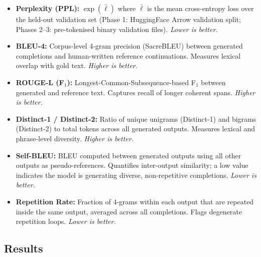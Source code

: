 \documentclass[12pt]{article}
\begin{document}
\begin{itemize}
    \item \textbf{Perplexity (PPL):} $\exp(\bar{\ell})$ where $\bar{\ell}$ is the mean cross-entropy loss over the held-out validation set (Phase 1: HuggingFace Arrow validation split; Phases 2--3: pre-tokenised binary validation files). \textit{Lower is better.}

    \item \textbf{BLEU-4:} Corpus-level 4-gram precision (SacreBLEU) between generated completions and human-written reference continuations. Measures lexical overlap with gold text. \textit{Higher is better.}

    \item \textbf{ROUGE-L (F$_1$):} Longest-Common-Subsequence-based F$_1$ between generated and reference text. Captures recall of longer coherent spans. \textit{Higher is better.}

    \item \textbf{Distinct-1 / Distinct-2:} Ratio of unique unigrams (Distinct-1) and bigrams (Distinct-2) to total tokens across all generated outputs. Measures lexical and phrase-level diversity. \textit{Higher is better.}

    \item \textbf{Self-BLEU:} BLEU computed between generated outputs using all other outputs as pseudo-references. Quantifies inter-output similarity; a low value indicates the model is generating diverse, non-repetitive completions. \textit{Lower is better.}

    \item \textbf{Repetition Rate:} Fraction of 4-grams within each output that are repeated inside the same output, averaged across all completions. Flags degenerate repetition loops. \textit{Lower is better.}
\end{itemize}

\subsection{Results}
\end{document}
